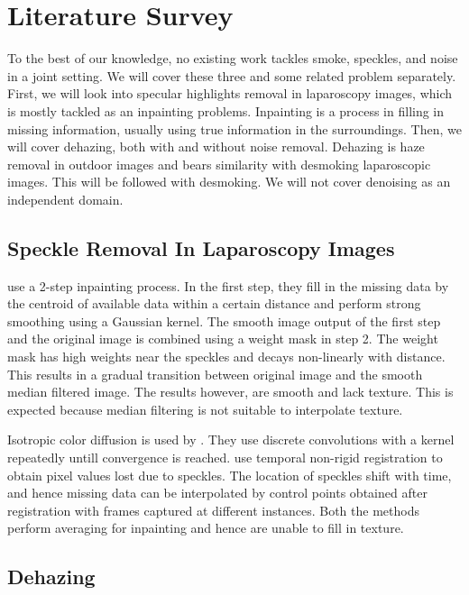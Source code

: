 
\chapter{Literature Survey}

To the best of our knowledge, no existing work tackles smoke, speckles, and noise in a joint setting. We will cover these three and some related problem separately. First, we will look into specular highlights removal in laparoscopy images, which is mostly tackled as an inpainting problems. Inpainting is a process in filling in missing information, usually using true information in the surroundings. Then, we will cover dehazing, both with and without noise removal. Dehazing is haze removal in outdoor images and bears similarity with desmoking laparoscopic images. This will be followed with desmoking. We will not cover denoising as an independent domain.

\section{Speckle Removal In Laparoscopy Images}
\cite{arnold2010speckle} use a 2-step inpainting process. In the first step, they fill in the missing data by the centroid of available data within a certain distance and perform strong smoothing using a Gaussian kernel. The smooth image output of the first step and the original image is combined using a weight mask in step 2. The weight mask has high weights near the speckles and decays non-linearly with distance. This results in a gradual transition between original image and the smooth median filtered image. The results however, are smooth and lack texture. This is expected because median filtering is not suitable to interpolate texture.

Isotropic color diffusion is used by \cite{saint2011detection}. They use discrete convolutions with a kernel repeatedly untill convergence is reached. \cite{stoyanov2005removing} use temporal non-rigid registration to obtain pixel values lost due to speckles. The location of speckles shift with time, and hence missing data can be interpolated by control points obtained after registration with frames captured at different instances. Both the methods perform averaging for inpainting and hence are unable to fill in texture.

\section{Dehazing}









